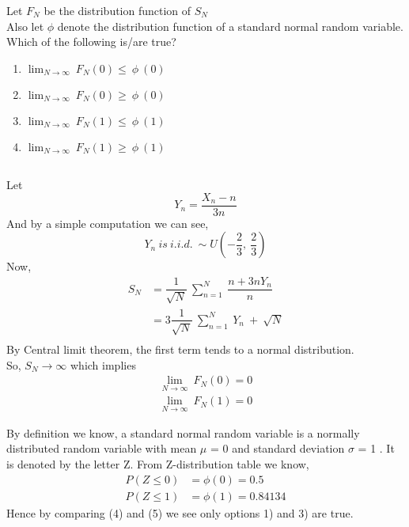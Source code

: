 \documentclass[journal,12pt,twocolumn]{IEEEtran}
\begin{document}
Let $F_N$ be the distribution function of $S_N$\\
Also let $\phi$ denote the distribution function of a standard normal random variable. Which of the following is/are true?\\
\begin{enumerate}
    \item {} $\lim_{N \to \infty}\ F_N(0) \leq\ \phi\ (0)$
    \item {} $\lim_{N \to \infty}\ F_N(0) \geq\ \phi\ (0)$
    \item {} $\lim_{N \to \infty}\ F_N(1) \leq\ \phi\ (1)$
    \item {} $\lim_{N \to \infty}\ F_N(1) \geq\ \phi\ (1)$
\end{enumerate}
\subsection*{}
Let 
\begin{equation}\tag{1}
    Y_n = \dfrac{X_n - n}{3n}
\end{equation}
And by a simple computation we can see,
\begin{equation}\tag{2}
    Y_n\ is\ i.i.d.\ \sim U(-\dfrac{2}{3},\ \dfrac{2}{3})
\end{equation}
Now,
\begin{equation}\tag{3}
    \begin{split}
        S_N &= \dfrac{1}{\sqrt{N}}\ \sum_{n=1}^{N}\ \dfrac{n + 3nY_n}{n}\\
            &= 3\dfrac{1}{\sqrt{N}}\ \sum_{n=1}^{N}\ Y_n\ +\ \sqrt{N}\\
    \end{split}
\end{equation}
By Central limit theorem, the first term tends to a normal distribution.\\
So, $S_N\rightarrow \infty$ which implies 
\begin{equation}\tag{4}
    \begin{split}
        \lim_{N \to \infty}\ F_N(0) = 0\\
        \lim_{N \to \infty}\ F_N(1) = 0
    \end{split}
\end{equation}

By definition we know, a standard normal random variable is a normally distributed random variable with mean $\mu$ = 0  and standard deviation $\sigma$ = 1 . It is denoted by the letter  Z. From Z-distribution table we know,
\begin{equation}\tag{5}
    \begin{split}
        P(Z\leqslant 0) &= \phi(0) = 0.5\\
        P(Z\leqslant 1) &= \phi(1) = 0.84134
    \end{split}
\end{equation}
Hence by comparing (4) and (5) we see only options 1) and 3) are true. 
\end{document}
